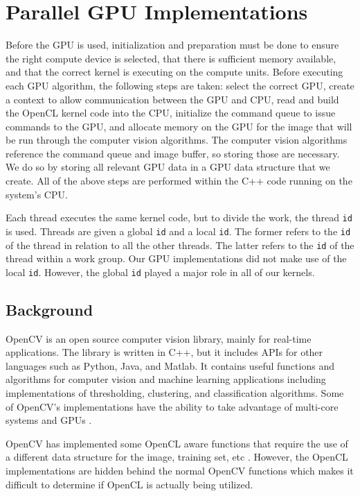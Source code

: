 \documentclass[conference]{IEEEtran}
\begin{document}
\section{Parallel GPU Implementations}
Before the GPU is used, initialization and preparation must be done to ensure the right compute device is selected, that there is sufficient memory available, and that the correct kernel is executing on the compute units. Before executing each GPU algorithm, the following steps are taken: select the correct GPU, create a context to allow communication between the GPU and CPU, read and build the OpenCL kernel code into the CPU, initialize the command queue to issue commands to the GPU, and allocate memory on the GPU for the image that will be run through the computer vision algorithms. The computer vision algorithms reference the command queue and image buffer, so storing those are necessary. We do so by storing all relevant GPU data in a GPU data structure that we create. All of the above steps are performed within the C++ code running on the system’s CPU.

Each thread executes the same kernel code, but to divide the work, the thread \verb|id| is used. Threads are given a global \verb|id| and a local \verb|id|. The former refers to the \verb|id| of the thread in relation to all the other threads. The latter refers to the \verb|id| of the thread within a work group. Our GPU implementations did not make use of the local \verb|id|. However, the global \verb|id| played a major role in all of our kernels.

\subsection{Background}
OpenCV is an open source computer vision library, mainly for real-time applications. The library is written in C++, but it includes APIs for other languages such as Python, Java, and Matlab. It contains useful functions and algorithms for computer vision and machine learning applications including implementations of thresholding, clustering, and classification algorithms. Some of OpenCV’s implementations have the ability to take advantage of multi-core systems and GPUs \cite{OpenCL}.

OpenCV has implemented some OpenCL aware functions that require the use of a different data structure for the image, training set, etc \cite{OpenCL}. However, the OpenCL implementations are hidden behind the normal OpenCV functions which makes it difficult to determine if OpenCL is actually being utilized.
\end{document}
